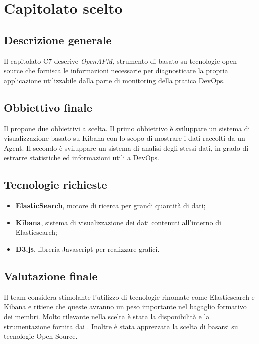 \section{Capitolato scelto}

\subsection{Descrizione generale}
Il capitolato C7 descrive \textit{OpenAPM}, strumento di  basato su tecnologie open source che 
fornisca le informazioni necessarie per diagnosticare la propria applicazione utilizzabile dalla parte di monitoring della pratica DevOps.

\subsection{Obbiettivo finale}
Il  propone due obbiettivi a scelta.
Il primo obbiettivo è sviluppare un sistema di visualizzazione basato su Kibana con lo scopo di mostrare i dati raccolti da un Agent. 
Il secondo è sviluppare un sistema di analisi  degli stessi dati, in grado di estrarre statistiche ed informazioni utili a DevOps.

\subsection{Tecnologie richieste}
\begin{itemize}
\item \textbf{ElasticSearch}, motore di ricerca per grandi quantità di dati;
\item \textbf{Kibana}, sistema di visualizzazione dei dati contenuti all'interno di Elasticsearch;
\item \textbf{D3.js}, libreria Javascript per realizzare grafici.
\end{itemize}

\subsection{Valutazione finale}
Il team considera stimolante l'utilizzo di tecnologie rinomate come Elasticsearch e Kibana e ritiene 
che queste avranno un peso importante nel bagaglio formativo dei membri. 
Molto rilevante nella scelta è stata la disponibilità e la strumentazione fornita dai .
Inoltre è stata apprezzata la scelta di basarsi su tecnologie Open Source.
